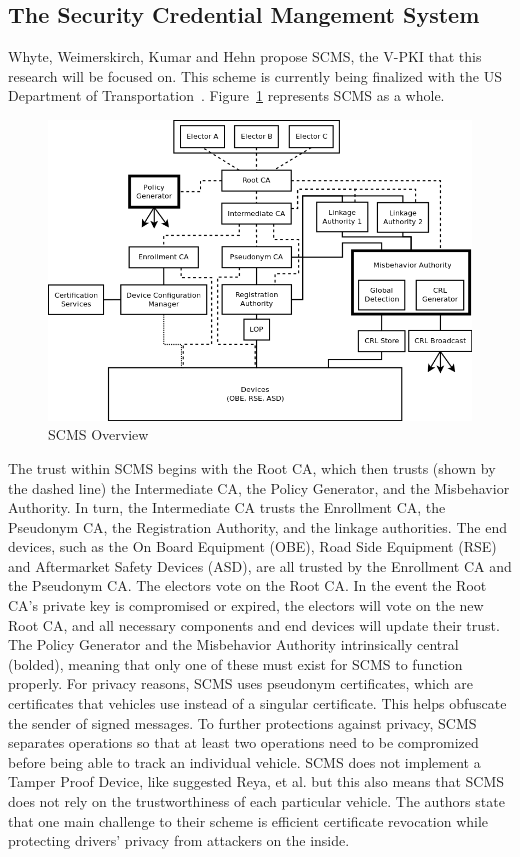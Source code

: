 \documentclass {article}
\begin{document}
\subsection{The Security Credential Mangement System}
Whyte, Weimerskirch, Kumar and Hehn propose SCMS, the V-PKI that this research will be focused on. This scheme is currently being finalized with the US Department of Transportation~\autocite{brecht_security_2018}. Figure~\ref{scms_overview} represents SCMS as a whole. 
\begin{figure}[!ht]
	\centering
	\includegraphics[width=.8\textwidth]{images/scms_diagram.png}
	\caption{SCMS Overview}
	\label{scms_overview}
\end{figure}
The trust within SCMS begins with the Root CA, which then trusts (shown by the dashed line) the Intermediate CA, the Policy Generator, and the Misbehavior Authority. In turn, the Intermediate CA trusts the Enrollment CA, the Pseudonym CA, the Registration Authority, and the linkage authorities. The end devices, such as the On Board Equipment (OBE), Road Side Equipment (RSE) and Aftermarket Safety Devices (ASD), are all trusted by the Enrollment CA and the Pseudonym CA. The electors vote on the Root CA. In the event the Root CA's private key is compromised or expired, the electors will vote on the new Root CA, and all necessary components and end devices will update their trust. The Policy Generator and the Misbehavior Authority intrinsically central (bolded), meaning that only one of these must exist for SCMS to function properly.
For privacy reasons, SCMS uses pseudonym certificates, which are certificates that vehicles use instead of a singular certificate. This helps obfuscate the sender of signed messages. To further protections against privacy, SCMS separates operations so that at least two operations need to be compromized before being able to track an individual vehicle. SCMS does not implement a Tamper Proof Device, like suggested Reya, et al. but this also means that SCMS does not rely on the trustworthiness of each particular vehicle. The authors state that one main challenge to their scheme is efficient certificate revocation while protecting drivers' privacy from attackers on the inside.
\end{document}
